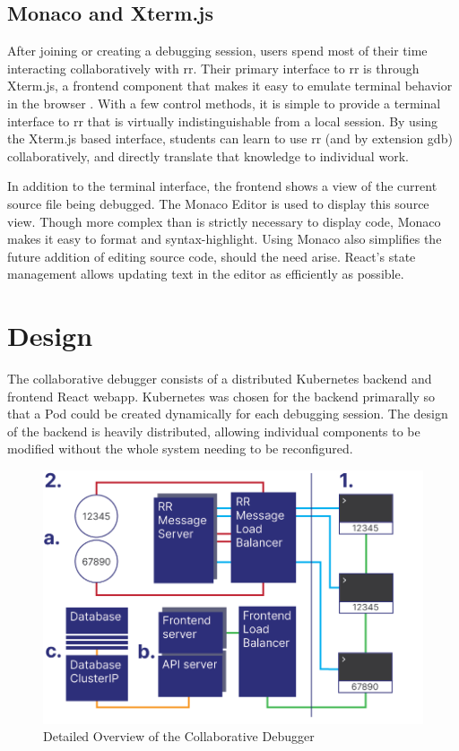\documentclass[12pt]{article}
\begin{document}
\subsection{Monaco and Xterm.js}\label{xtermjs/monaco}

After joining or creating a debugging session, users spend most of
their time interacting collaboratively with rr.  Their primary
interface to rr is through Xterm.js, a frontend component that makes
it easy to emulate terminal behavior in the browser \cite{xtermjs}.
With a few control methods, it is simple to provide a terminal
interface to rr that is virtually indistinguishable from a local
session.  By using the Xterm.js based interface, students can learn to
use rr (and by extension gdb) collaboratively, and directly translate
that knowledge to individual work.
\par

In addition to the terminal interface, the frontend shows a view of
the current source file being debugged.  The Monaco Editor
\cite{monaco} is used to display this source view.  Though more
complex than is strictly necessary to display code, Monaco makes it
easy to format and syntax-highlight.  Using Monaco also simplifies the
future addition of editing source code, should the need arise.
React's state management allows updating text in the editor as
efficiently as possible.

\section{Design}

The collaborative debugger consists of a distributed Kubernetes
backend and frontend React webapp.  Kubernetes was chosen for the
backend primarally so that a Pod could be created dynamically for each
debugging session.  The design of the backend is heavily distributed,
allowing individual components to be modified without the whole system
needing to be reconfigured.

\begin{figure}[h!]

  \includegraphics[scale=.9]{detailed_system}
  \centering
  \caption{Detailed Overview of the Collaborative Debugger}
  \label{debugger:detailedoverview}
\end{figure}
\end{document}
